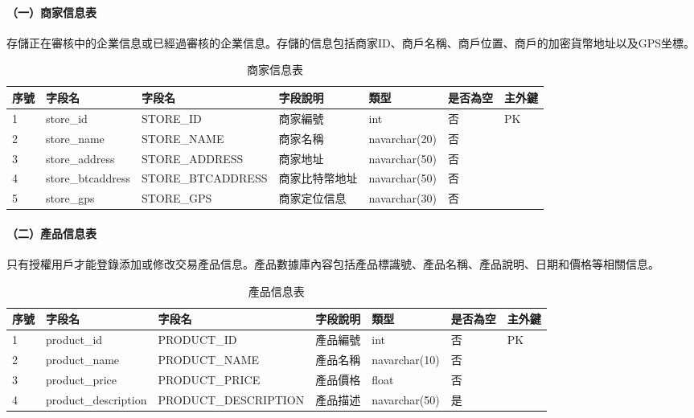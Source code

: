 			\paragraph{（一）商家信息表}存儲正在審核中的企業信息或已經過審核的企業信息。存儲的信息包括商家ID、商戶名稱、商戶位置、商戶的加密貨幣地址以及GPS坐標。
				\begin{table}[htbp]
				\centering
				\caption{商家信息表}
				\label{store}
				\begin{tabular}{|l|l|l|l|l|l|l|}
				\hline
				序號 & 字段名 & 字段名 & 字段說明 & 類型 & 是否為空 & 主外鍵 \\ \hline
				1 & store\_id & STORE\_ID & 商家編號 & int & 否 & PK \\ \hline
				2 & store\_name & STORE\_NAME & 商家名稱 & navarchar(20) & 否 &  \\ \hline
				3 & store\_address & STORE\_ADDRESS & 商家地址 & navarchar(50) & 否 &  \\ \hline
				4 & store\_btcaddress & STORE\_BTCADDRESS & 商家比特幣地址 & navarchar(50) & 否 &  \\ \hline
				5 & store\_gps & STORE\_GPS & 商家定位信息 & navarchar(30) & 否 &  \\ \hline
				\end{tabular}
				\end{table}
			\paragraph{（二）產品信息表}只有授權用戶才能登錄添加或修改交易產品信息。產品數據庫內容包括產品標識號、產品名稱、產品說明、日期和價格等相關信息。

				\begin{table}[htbp]
				\centering
				\caption{產品信息表}
				\label{product}
				\begin{tabular}{|l|l|l|l|l|l|l|}
				\hline
				序號 & 字段名 & 字段名 & 字段說明 & 類型 & 是否為空 & 主外鍵 \\ \hline
				1 & product\_id & PRODUCT\_ID & 產品編號 & int & 否 & PK \\ \hline
				2 & product\_name & PRODUCT\_NAME & 產品名稱 & navarchar(10) & 否 &  \\ \hline
				3 & product\_price & PRODUCT\_PRICE & 產品價格 & float & 否 &  \\ \hline
				4 & product\_description & PRODUCT\_DESCRIPTION & 產品描述 & navarchar(50) & 是 &  \\ \hline
				\end{tabular}
				\end{table}

